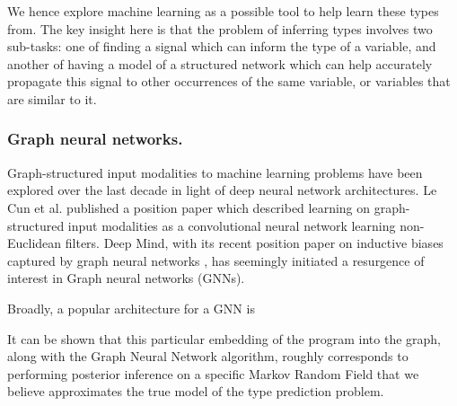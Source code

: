We hence explore machine learning as a possible tool to help learn these types from. The key insight here is that the problem of inferring types involves two sub-tasks: one of finding a signal which can inform the type of a variable, and another of having a model of a structured network which can help accurately propagate this signal to other occurrences of the same variable, or variables that are similar to it.

\subsubsection{Graph neural networks.} 
Graph-structured input modalities to machine learning problems have been explored over the last decade in light of deep neural network architectures. Le Cun et al. published a position paper \cite{} which described learning on graph-structured input modalities as a convolutional neural network learning non-Euclidean filters. Deep Mind, with its recent position paper on inductive biases captured by graph neural networks \cite{}, has seemingly initiated a resurgence of interest in Graph neural networks (GNNs). 

Broadly, a popular architecture for a GNN is 


It can be shown that this particular embedding of the program into the graph, along with the Graph Neural Network algorithm, roughly corresponds to performing posterior inference on a specific Markov Random Field that we believe approximates the true model of the type prediction problem.


